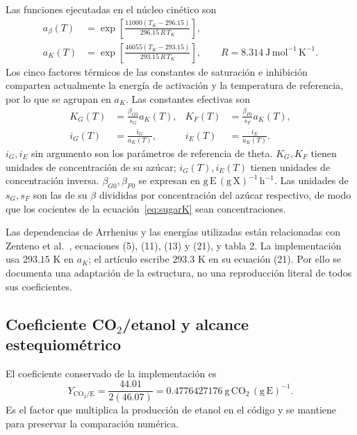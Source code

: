 \documentclass[11pt,a4paper]{article}
\begin{document}
Las funciones ejecutadas en el núcleo cinético son
\begin{align}
a_\beta(T)&=\exp\left[\frac{11000(T_K-296.15)}{296.15\,R\,T_K}\right],
\label{eq:abeta}\\
a_K(T)&=\exp\left[\frac{46055(T_K-293.15)}{293.15\,R\,T_K}\right],
\qquad R=8.314\ \mathrm{J\,mol^{-1}\,K^{-1}}.\label{eq:ak}
\end{align}
Los cinco factores térmicos de las constantes de saturación e inhibición
comparten actualmente la energía de activación y la temperatura de referencia,
por lo que se agrupan en $a_K$. Las constantes efectivas son
\begin{align}
K_G(T)&=\frac{\beta_{G0}}{s_G}a_K(T),&
K_F(T)&=\frac{\beta_{F0}}{s_F}a_K(T),\label{eq:sugarK}\\
i_G(T)&=\frac{i_G}{a_K(T)},&
i_E(T)&=\frac{i_E}{a_K(T)}.\label{eq:inhibition}
\end{align}
$i_G,i_E$ sin argumento son los parámetros de referencia de theta.
$K_G,K_F$ tienen unidades de concentración de su azúcar;
$i_G(T),i_E(T)$ tienen unidades de concentración inversa.
$\beta_{G0},\beta_{F0}$ se expresan en
$\mathrm{g\,E\,(g\,X)^{-1}\,h^{-1}}$. Las unidades de $s_G,s_F$ son las de
su $\beta$ divididas por concentración del azúcar respectivo, de modo que
los cocientes de la ecuación~\eqref{eq:sugarK} sean concentraciones.

Las dependencias de Arrhenius y las energías utilizadas están relacionadas con
Zenteno et al.~\cite{zenteno2010}, ecuaciones (5), (11), (13) y (21),
y tabla 2. La implementación usa $293.15$ K en $a_K$; el artículo escribe
$293.3$ K en su ecuación (21). Por ello se documenta una adaptación de la
estructura, no una reproducción literal de todos sus coeficientes.

\subsection{Coeficiente \texorpdfstring{CO\(_2\)}{CO2}/etanol y alcance estequiométrico}
\label{sec:yield}

El coeficiente conservado de la implementación es
\begin{equation}
Y_{\mathrm{CO_2/E}}=\frac{44.01}{2(46.07)}
=0.4776427176\ \mathrm{g\,CO_2\,(g\,E)^{-1}}.
\label{eq:yield}
\end{equation}
Es el factor que multiplica la producción de etanol en el código y se
mantiene para preservar la comparación numérica.
\end{document}
